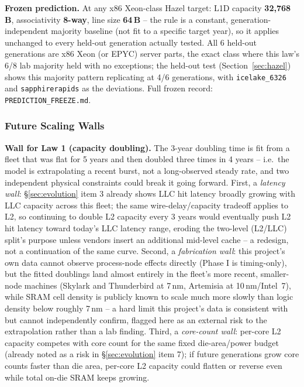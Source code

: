 \documentclass{article}
\begin{document}
\noindent
\textbf{Frozen prediction.} At any x86 Xeon-class Hazel target: L1D capacity \textbf{32,768\,B},
associativity \textbf{8-way}, line size \textbf{64\,B} -- the rule is a constant,
generation-independent majority baseline (not fit to a specific target year), so it applies
unchanged to every held-out generation actually tested. All 6 held-out generations are x86
Xeon (or EPYC) server parts, the exact class where this law's 6/8 lab majority held with no
exceptions; the held-out test (Section~\ref{sec:hazel}) shows this majority pattern replicating
at 4/6 generations, with \texttt{icelake\_6326} and \texttt{sapphirerapids} as the deviations.
Full frozen record: \texttt{PREDICTION\_FREEZE.md}.

\subsubsection*{Future Scaling Walls}

\textbf{Wall for Law 1 (capacity doubling).} The 3-year doubling time is fit from a fleet that was flat
for 5 years and then doubled three times in 4 years -- i.e.\ the model is extrapolating a recent burst,
not a long-observed steady rate, and two independent physical constraints could break it going
forward. First, a \emph{latency wall}: \S\ref{sec:evolution} item 3 already shows LLC hit latency
broadly growing with LLC capacity across this fleet; the same wire-delay/capacity tradeoff applies to
L2, so continuing to double L2 capacity every 3 years would eventually push L2 hit latency toward
today's LLC latency range, eroding the two-level (L2/LLC) split's purpose unless vendors insert an
additional mid-level cache -- a redesign, not a continuation of the same curve. Second, a
\emph{fabrication wall}: this project's own data cannot observe process-node effects directly (Phase I
is timing-only), but the fitted doublings land almost entirely in the fleet's more recent, smaller-node
machines (Skylark and Thunderbird at 7\,nm, Artemisia at 10\,nm/Intel~7), while SRAM cell density is
publicly known to scale much more slowly than logic density below roughly 7\,nm -- a hard limit this
project's data is consistent with but cannot independently confirm, flagged here as an external risk
to the extrapolation rather than a lab finding. Third, a \emph{core-count wall}: per-core L2 capacity
competes with core count for the same fixed die-area/power budget (already noted as a risk in
\S\ref{sec:evolution} item 7); if future generations grow core counts faster than die area, per-core L2
capacity could flatten or reverse even while total on-die SRAM keeps growing.
\end{document}
